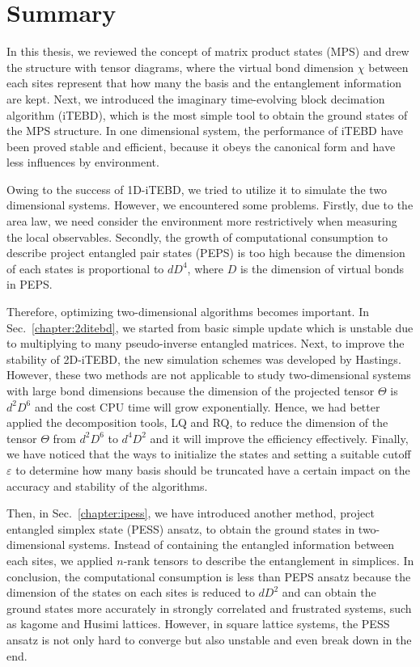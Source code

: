 \chapter{Summary}
\label{chapter:summary}

In this thesis, we reviewed the concept of matrix product states (MPS) and drew the structure with tensor diagrams, where the virtual bond dimension $\chi$ between each sites represent that how many the basis and the entanglement information are kept. Next, we introduced the imaginary time-evolving block decimation algorithm (iTEBD), which is the most simple tool to obtain the ground states of the MPS structure. In one dimensional system, the performance of iTEBD have been proved stable and efficient, because it obeys the canonical form and have less influences by environment. 

Owing to the success of 1D-iTEBD, we tried to utilize it to simulate the two dimensional systems. However, we encountered some problems. Firstly, due to the area law, we need consider the environment more restrictively when measuring the local observables. Secondly, the growth of computational consumption to describe project entangled pair states (PEPS) is too high because the dimension of each states is proportional to $dD^4$, where $D$ is the dimension of virtual bonds in PEPS.

Therefore, optimizing two-dimensional algorithms becomes important. In Sec.~\ref{chapter:2ditebd}, we started from basic simple update which is unstable due to multiplying to many pseudo-inverse entangled matrices. Next, to improve the stability of 2D-iTEBD, the new simulation schemes was developed by Hastings. However, these two methods are not applicable to study two-dimensional systems with large bond dimensions because the dimension of the projected tensor $\Theta$ is $d^2D^6$ and the cost CPU time will grow exponentially. Hence, we had better applied the decomposition tools, LQ and RQ, to reduce the dimension of the tensor $\Theta$ from $d^2D^6$ to $d^4D^2$ and it will improve the efficiency effectively. Finally, we have noticed that the ways to initialize the states and setting a suitable cutoff $\varepsilon$ to determine how many basis should be truncated have a certain impact on the accuracy and stability of the algorithms. 

Then, in Sec.~\ref{chapter:ipess}, we have introduced another method, project entangled simplex state (PESS) ansatz, to obtain the ground states in two-dimensional systems. Instead of containing the entangled information between each sites, we applied $n$-rank tensors to describe the entanglement in simplices. In conclusion, the computational consumption is less than PEPS ansatz because the dimension of the states on each sites is reduced to $dD^2$ and can obtain the ground states more accurately in strongly correlated and frustrated systems, such as kagome and Husimi lattices. However, in square lattice systems, the PESS ansatz is not only hard to converge but also unstable and even break down in the end.

